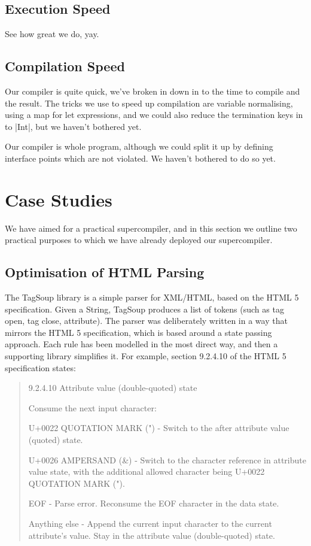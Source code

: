 \documentclass{sigplanconf}
\begin{document}
\subsection{Execution Speed}

See how great we do, yay.

\subsection{Compilation Speed}

Our compiler is quite quick, we've broken in down in to the time to compile and the result. The tricks we use to speed up compilation are variable normalising, using a map for let expressions, and we could also reduce the termination keys in to |Int|, but we haven't bothered yet.

Our compiler is whole program, although we could split it up by defining interface points which are not violated. We haven't bothered to do so yet.

\section{Case Studies}

We have aimed for a practical supercompiler, and in this section we outline two practical purposes to which we have already deployed our supercompiler.

\subsection{Optimisation of HTML Parsing}
\label{sec:tagsoup}

The TagSoup library \cite{tagsoup} is a simple parser for XML/HTML, based on the HTML 5 specification. Given a String, TagSoup produces a list of tokens (such as tag open, tag close, attribute). The parser was deliberately written in a way that mirrors the HTML 5 specification, which is based around a state passing approach. Each rule has been modelled in the most direct way, and then a supporting library simplifies it. For example, section 9.2.4.10 of the HTML 5 specification states:

\begin{quote}
9.2.4.10 Attribute value (double-quoted) state

Consume the next input character:

U+0022 QUOTATION MARK (") - Switch to the after attribute value (quoted) state.

U+0026 AMPERSAND (\&) - Switch to the character reference in attribute value state, with the additional allowed character being U+0022 QUOTATION MARK (").

EOF - Parse error. Reconsume the EOF character in the data state.

Anything else - Append the current input character to the current attribute's value. Stay in the attribute value (double-quoted) state.
\end{quote}
\end{document}

